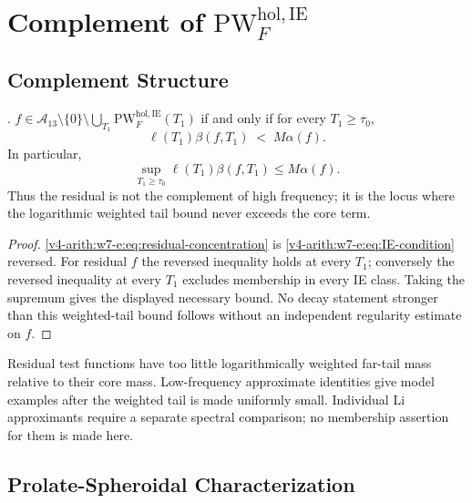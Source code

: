 \section{Complement of \(\mathrm{PW}^{\mathrm{hol},\mathrm{IE}}_{F}\)}
\label{v4-arith:w7-e:residual}

\subsection{Complement Structure}
\label{v4-arith:w7-e:complement}

\begin{theorem}
\label{v4-arith:w7-e:thm:IE-residual}
\ClaimStatusProvedHere. \(f\in\mathscr A_{13}\setminus\{0\}\setminus\bigcup_{T_{1}}\mathrm{PW}^{\mathrm{hol},\mathrm{IE}}_{F}(T_{1})\)
if and only if for every \(T_{1}\geq \tau_0\),
\begin{equation}
\label{v4-arith:w7-e:eq:residual-concentration}
\ell(T_{1})\beta(f,T_{1})\;<\;M\alpha(f).
\end{equation}
In particular,
\[
\sup_{T_{1}\geq \tau_0}\ell(T_{1})\beta(f,T_{1})\leq M\alpha(f).
\]
Thus the residual is not the complement of high frequency; it is the
locus where the logarithmic weighted tail bound never exceeds the core term.
\end{theorem}

\begin{proof}
\eqref{v4-arith:w7-e:eq:residual-concentration} is
\eqref{v4-arith:w7-e:eq:IE-condition} reversed. For residual \(f\) the
reversed inequality holds at every \(T_{1}\); conversely the reversed
inequality at every \(T_{1}\) excludes membership in every IE class.
Taking the supremum gives the displayed necessary bound. No decay statement
stronger than this weighted-tail bound follows without an independent
regularity estimate on \(f\).
\end{proof}

\begin{remark}
\label{v4-arith:w7-e:rem:residual-characterization}
Residual test functions have too little logarithmically weighted
far-tail mass relative to their core mass. Low-frequency approximate
identities give model examples after the weighted tail is made
uniformly small. Individual Li approximants require a separate
spectral comparison; no membership assertion for them is made here.
\end{remark}

\subsection{Prolate-Spheroidal Characterization}
\label{v4-arith:w7-e:prolate}

